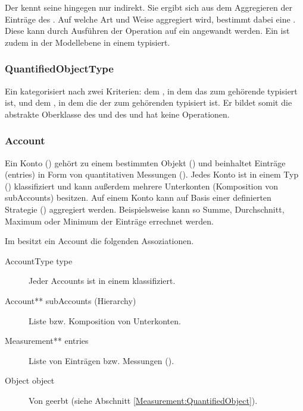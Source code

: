 Der  kennt seine  hingegen nur indirekt. Sie ergibt sich aus dem Aggregieren der Einträge
 des . Auf welche Art und Weise aggregiert wird, bestimmt dabei eine
. Diese kann durch Ausführen der Operation  auf ein 
angewandt werden. Ein  ist zudem in der Modellebene in einem  typisiert.


\subsubsection{QuantifiedObjectType}
Ein  kategorisiert  nach zwei Kriterien: dem , in dem das
zum  gehörende  typisiert ist, und dem , in dem die 
der zum  gehörenden  typisiert ist. Er bildet somit die abstrakte Oberklasse des
 und des  und hat keine Operationen.


\subsubsection{Account}
Ein Konto () gehört zu einem bestimmten Objekt () und beinhaltet Einträge (entries) in Form von quantitativen Messungen (). 
Jedes Konto ist in einem Typ () klassifiziert und kann außerdem mehrere Unterkonten (Komposition von subAccounts) besitzen.
Auf einem Konto kann auf Basis einer definierten Strategie () aggregiert werden. 
Beispielsweise kann so Summe, Durchschnitt, Maximum oder Minimum der Einträge errechnet werden. 

Im \MM besitzt ein Account die folgenden Assoziationen.
\begin{description}
	\item[AccountType type] Jeder Accounts ist in einem  klassifiziert.
	\item[Account** subAccounts (Hierarchy)] Liste bzw. Komposition von Unterkonten.
	\item[Measurement** entries] Liste von Einträgen bzw. Messungen ().
	\item[Object object] Von  geerbt (siehe Abschnitt \ref{Measurement:QuantifiedObject}).
\end{description}

